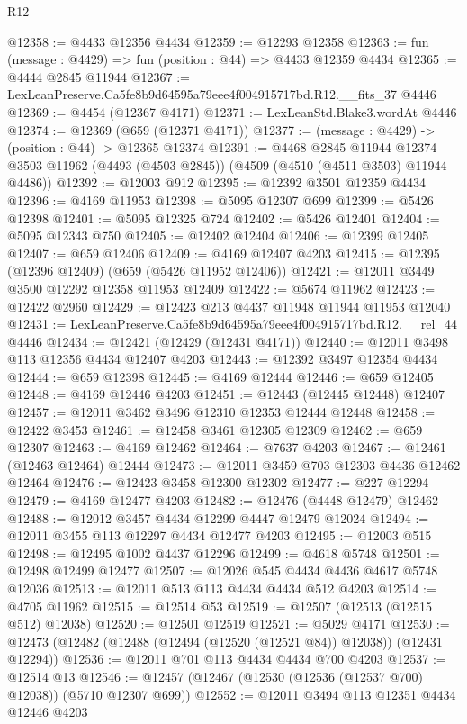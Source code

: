 \begin{lexlean}{R12}
\begin{coremodule}
@12358 := @4433 @12356 @4434
@12359 := @12293 @12358
@12363 := fun (message : @4429) => fun (position : @44) => @4433 @12359 @4434
@12365 := @4444 @2845 @11944
@12367 := LexLeanPreserve.Ca5fe8b9d64595a79eee4f004915717bd.R12.__fits_37 @4446
@12369 := @4454 (@12367 @4171)
@12371 := LexLeanStd.Blake3.wordAt @4446
@12374 := @12369 (@659 (@12371 @4171))
@12377 := (message : @4429) -> (position : @44) -> @12365 @12374
@12391 := @4468
    @2845
    @11944
    @12374
    @3503
    @11962
    (@4493 (@4503 @2845))
    (@4509 (@4510 (@4511 @3503) @11944 @4486))
@12392 := @12003 @912
@12395 := @12392 @3501 @12359 @4434
@12396 := @4169 @11953
@12398 := @5095 @12307 @699
@12399 := @5426 @12398
@12401 := @5095 @12325 @724
@12402 := @5426 @12401
@12404 := @5095 @12343 @750
@12405 := @12402 @12404
@12406 := @12399 @12405
@12407 := @659 @12406
@12409 := @4169 @12407 @4203
@12415 := @12395 (@12396 @12409) (@659 (@5426 @11952 @12406))
@12421 := @12011 @3449 @3500 @12292 @12358 @11953 @12409
@12422 := @5674 @11962
@12423 := @12422 @2960
@12429 := @12423 @213 @4437 @11948 @11944 @11953 @12040
@12431 := LexLeanPreserve.Ca5fe8b9d64595a79eee4f004915717bd.R12.__rel_44 @4446
@12434 := @12421 (@12429 (@12431 @4171))
@12440 := @12011 @3498 @113 @12356 @4434 @12407 @4203
@12443 := @12392 @3497 @12354 @4434
@12444 := @659 @12398
@12445 := @4169 @12444
@12446 := @659 @12405
@12448 := @4169 @12446 @4203
@12451 := @12443 (@12445 @12448) @12407
@12457 := @12011 @3462 @3496 @12310 @12353 @12444 @12448
@12458 := @12422 @3453
@12461 := @12458 @3461 @12305 @12309
@12462 := @659 @12307
@12463 := @4169 @12462
@12464 := @7637 @4203
@12467 := @12461 (@12463 @12464) @12444
@12473 := @12011 @3459 @703 @12303 @4436 @12462 @12464
@12476 := @12423 @3458 @12300 @12302
@12477 := @227 @12294
@12479 := @4169 @12477 @4203
@12482 := @12476 (@4448 @12479) @12462
@12488 := @12012 @3457 @4434 @12299 @4447 @12479 @12024
@12494 := @12011 @3455 @113 @12297 @4434 @12477 @4203
@12495 := @12003 @515
@12498 := @12495 @1002 @4437 @12296
@12499 := @4618 @5748
@12501 := @12498 @12499 @12477
@12507 := @12026 @545 @4434 @4436 @4617 @5748 @12036
@12513 := @12011 @513 @113 @4434 @4434 @512 @4203
@12514 := @4705 @11962
@12515 := @12514 @53
@12519 := @12507 (@12513 (@12515 @512) @12038)
@12520 := @12501 @12519
@12521 := @5029 @4171
@12530 := @12473 (@12482 (@12488 (@12494 (@12520 (@12521 @84)) @12038)) (@12431 @12294))
@12536 := @12011 @701 @113 @4434 @4434 @700 @4203
@12537 := @12514 @13
@12546 := @12457 (@12467 (@12530 (@12536 (@12537 @700) @12038)) (@5710 @12307 @699))
@12552 := @12011 @3494 @113 @12351 @4434 @12446 @4203

\end{coremodule}
\end{lexlean}
